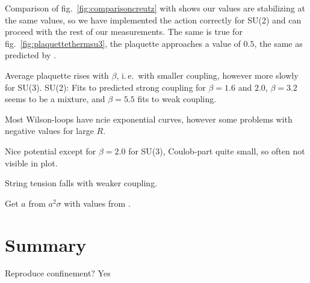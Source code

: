 \documentclass[%
 reprint,
 amsmath,amssymb,
 aps,
]{revtex4-1}
\begin{document}
Comparison of fig.~\ref{fig:comparisoncreutz} with \citet{creutzsu2} shows our values are stabilizing at the same values, so we have implemented the action correctly for SU(2) and can proceed with the rest of our measurements. The same is true for fig.~\ref{fig:plaquettethermsu3}, the plaquette approaches a value of $0.5$, the same as predicted by \citet{lepagelqcd}. 


Average plaquette rises with $\beta$, i.\,e.\, with smaller coupling, however more slowly for SU(3). SU(2): Fits to predicted strong coupling for $\beta=1.6$ and $2.0$, $\beta=3.2$ seems to be a mixture, and $\beta=5.5$ fits to weak coupling.

Most Wilson-loops have ncie exponential curves, however some problems with negative values for large $R$. 

Nice potential except for $\beta=2.0$ for SU(3), Coulob-part quite small, so often not visible in plot.

String tension falls with weaker coupling.

Get $a$ from $a^2\sigma$ with values from \cite{Cardoso_2011}.
%
%

\section{Summary}

Reproduce confinement? Yes


\end{document}
